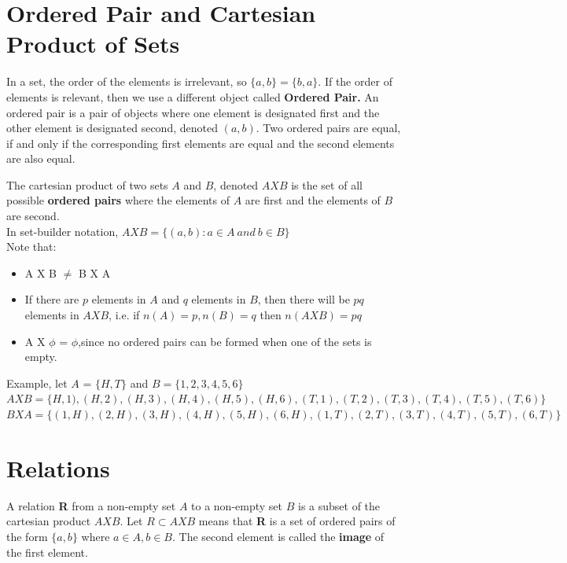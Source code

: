 \documentclass{book}
\begin{document}
		\section{Ordered Pair and Cartesian Product of Sets}
		
		In a set, the order of the elements is irrelevant, so $\{a,b\} = \{b,a\}$. If the order of elements is relevant, then we use a different object called \textbf{Ordered Pair.} An ordered pair is a pair of objects where one element is designated first and the other element is designated second, denoted $(a,b)$. Two ordered pairs are equal, if and only if the corresponding first elements are equal and the second elements are also equal.
		
		\begin{mdframed}[backgroundcolor=yellow]
			The cartesian product of two sets $A$ and $B$, denoted $A X B$ is the set of all possible \textbf{ordered pairs} where the elements of $A$ are first and the elements of $B$ are second. \\
			In set-builder notation, $A X B = \{(a,b): a \in A \: and \: b \in B\}$ \\
			Note that:
			\begin{itemize}
				\item A X B $\neq$ B X A
				\item If there are $p$ elements in $A$ and $q$ elements in $B$, then there will be $pq$ elements in $AXB$, i.e. if $n(A)=p, n(B)=q$ then $n(AXB)=pq$
				\item A X $\phi$ = $\phi$,since no ordered pairs can be formed when one of the sets is empty.
			\end{itemize}
		\end{mdframed}
		Example, let $A$ = $\{H,T\}$ and $B = \{1,2,3,4,5,6\}$ \\
		$A X B = \{H, 1), (H, 2), (H, 3), (H, 4), (H, 5), (H, 6), (T, 1), (T, 2), (T, 3), (T, 4), (T, 5), (T, 6)\}$ \\
		$B X A = \{(1, H), (2, H), (3, H), (4, H), (5, H), (6, H), (1, T), (2, T), (3, T), (4, T), (5, T), (6, T)\}$\\
		
		\section{Relations}
		A relation \textbf{R} from a non-empty set $A$ to a non-empty set $B$ is a subset of the cartesian product $A X B$. Let $R \subset A X B$ means that \textbf{R} is a set of ordered pairs of the form $\{a,b\}$ where $a \in A, b \in B$. The second element is called the \textbf{image} of the first element.\\
		
\end{document}
